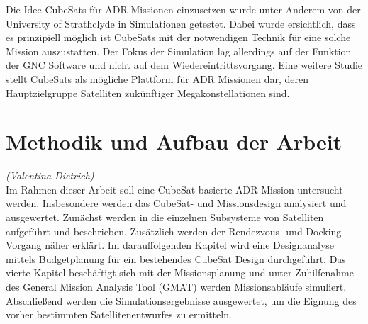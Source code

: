Die Idee CubeSats für ADR-Missionen einzusetzen wurde unter Anderem von der University of Strathclyde in Simulationen getestet. Dabei wurde ersichtlich, dass es prinzipiell möglich ist CubeSats mit der notwendigen Technik für eine solche Mission auszustatten. Der Fokus der Simulation lag allerdings auf der Funktion der GNC Software und nicht auf dem Wiedereintrittsvorgang\cite{Pirat.2017}. Eine weitere Studie stellt CubeSats als mögliche Plattform für ADR Missionen dar, deren Hauptzielgruppe Satelliten zukünftiger Megakonstellationen sind\cite{BenLarbi.2017}.


	\section{Methodik und Aufbau der Arbeit}
		\hfill\emph{(Valentina Dietrich)}\\	
Im Rahmen dieser Arbeit soll eine  CubeSat basierte ADR-Mission untersucht werden. Insbesondere werden das CubeSat- und Missionsdesign analysiert und ausgewertet. Zunächst werden in  die einzelnen Subsysteme von Satelliten aufgeführt und beschrieben. Zusätzlich werden der Rendezvous- und Docking Vorgang näher erklärt. Im darauffolgenden Kapitel wird eine Designanalyse mittels Budgetplanung für ein bestehendes CubeSat Design durchgeführt.  Das vierte Kapitel beschäftigt sich mit der Missionsplanung und unter Zuhilfenahme des General Mission Analysis Tool (GMAT) werden Missionsabläufe simuliert. Abschließend werden die Simulationsergebnisse ausgewertet, um die Eignung des vorher bestimmten Satellitenentwurfes zu ermitteln.
